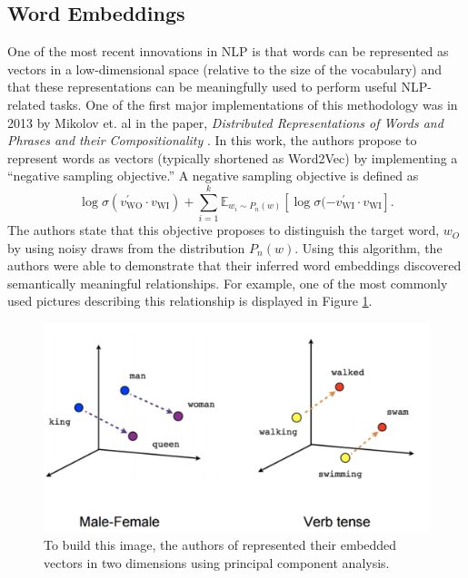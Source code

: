 \documentclass[../thesis.tex]{subfiles}
\begin{document}
\subsection{Word Embeddings}
One of the most recent innovations in NLP is that words can be represented as
vectors in a low-dimensional space (relative to the size of the vocabulary) and
that these representations can be meaningfully used to perform useful
NLP-related tasks. One of the first major implementations of this methodology
was in 2013 by Mikolov et. al in the paper, \textit{Distributed Representations
of Words and Phrases and their Compositionality} \cite{mikolov2013distributed}.
In this work, the authors propose to represent words as vectors (typically
shortened as Word2Vec) by implementing a ``negative sampling objective.'' A
negative sampling objective is defined as
\begin{equation}
    \log \sigma\left(v_{\text{WO}}^\prime \cdot v_{\text{WI}}\right) +
    \sum_{i=1}^k \mathbb{E}_{w_i \sim P_n(w)} \left[\log
    \sigma(-v_{\text{WI}}^\prime \cdot v_{\text{WI}}\right].
\end{equation}
The authors state that this objective proposes to distinguish the target word,
$w_O$ by using noisy draws from the distribution $P_n(w)$. Using this algorithm,
the authors were able to demonstrate that their inferred word embeddings
discovered semantically meaningful relationships. For example, one of the most
commonly used pictures describing this relationship is displayed in Figure
\ref{fig:word2vec}.
\begin{figure}
    \centering
    \includegraphics[width=\linewidth]{images/word2vec.pdf}
    \caption[Word2Vec Example]{To build this image, the authors of
    \cite{mikolov2013distributed} represented their embedded vectors in two
    dimensions using principal component analysis.}
    \label{fig:word2vec}
\end{figure}
\end{document}
